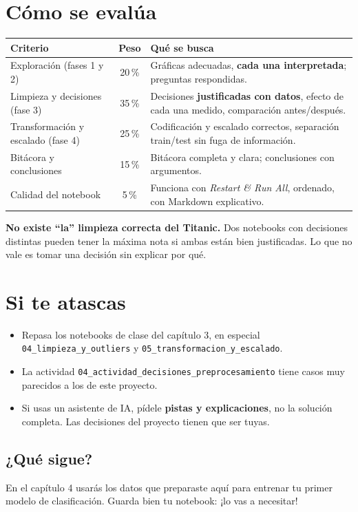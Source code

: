 \documentclass[11pt,a4paper]{article}
\newcommand{\col}[1]{\texttt{#1}}
\begin{document}
\section*{Cómo se evalúa}

\begin{tabularx}{\textwidth}{@{}l c X@{}}
\toprule
\textbf{Criterio} & \textbf{Peso} & \textbf{Qué se busca} \\
\midrule
Exploración (fases 1 y 2) & 20\,\% &
  Gráficas adecuadas, \textbf{cada una interpretada}; preguntas respondidas. \\
Limpieza y decisiones (fase 3) & 35\,\% &
  Decisiones \textbf{justificadas con datos}, efecto de cada una medido, comparación antes/después. \\
Transformación y escalado (fase 4) & 25\,\% &
  Codificación y escalado correctos, separación train/test sin fuga de información. \\
Bitácora y conclusiones & 15\,\% &
  Bitácora completa y clara; conclusiones con argumentos. \\
Calidad del notebook & 5\,\% &
  Funciona con \emph{Restart \& Run All}, ordenado, con Markdown explicativo. \\
\bottomrule
\end{tabularx}

\begin{nota}
\textbf{No existe ``la'' limpieza correcta del Titanic.} Dos notebooks con decisiones
distintas pueden tener la máxima nota si ambas están bien justificadas. Lo que no vale es
tomar una decisión sin explicar por qué.
\end{nota}

\section*{Si te atascas}
\begin{itemize}
  \item Repasa los notebooks de clase del capítulo 3, en especial
        \col{04\_limpieza\_y\_outliers} y \col{05\_transformacion\_y\_escalado}.
  \item La actividad \col{04\_actividad\_decisiones\_preprocesamiento} tiene casos muy
        parecidos a los de este proyecto.
  \item Si usas un asistente de IA, pídele \textbf{pistas y explicaciones}, no la solución
        completa. Las decisiones del proyecto tienen que ser tuyas.
\end{itemize}

\subsection*{¿Qué sigue?}

En el capítulo 4 usarás los datos que preparaste aquí para entrenar tu primer modelo de
clasificación. Guarda bien tu notebook: ¡lo vas a necesitar!
\end{document}
